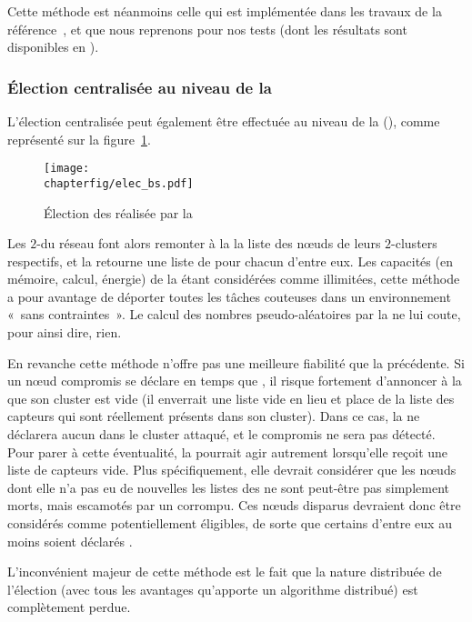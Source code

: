 Cette méthode est néanmoins celle qui est implémentée dans les travaux de la référence~\cite{GMT12}, et que nous reprenons pour nos tests (dont les résultats sont disponibles en ).

        \subsubsection{Élection centralisée au niveau de la \sdb}
L'élection centralisée peut également être effectuée au niveau de la \sdb (\BS), comme représenté sur la figure~\ref{sa:fig:elecbs}.
\begin{figure}[ht]
    \centering
    \texttt{[image: \\chapterfig/elec\_bs.pdf]}
    \caption{Élection des \cns réalisée par la \sdb}\label{sa:fig:elecbs}
\end{figure}
Les $2$-\CH du réseau font alors remonter à la \BS la liste des nœuds de leurs $2$-clusters respectifs, et la \BS retourne une liste de \cns pour chacun d'entre eux.
Les capacités (en mémoire, calcul, énergie) de la \sdb étant considérées comme illimitées, cette méthode a pour avantage de déporter toutes les tâches couteuses dans un environnement «~sans contraintes~».
Le calcul des nombres pseudo-aléatoires par la \sdb ne lui coute, pour ainsi dire, rien.

En revanche cette méthode n'offre pas une meilleure fiabilité que la précédente.
Si un nœud compromis se déclare en temps que \CH, il risque fortement d'annoncer à la \BS que son cluster est vide (il enverrait une liste vide en lieu et place de la liste des capteurs qui sont réellement présents dans son cluster).
Dans ce cas, la \sdb ne déclarera aucun \cn dans le cluster attaqué, et le \CH compromis ne sera pas détecté.
Pour parer à cette éventualité, la \sdb pourrait agir autrement lorsqu'elle reçoit une liste de capteurs vide.
Plus spécifiquement, elle devrait considérer que les nœuds dont elle n'a pas eu de nouvelles \via les listes des \CH ne sont peut-être pas simplement morts, mais escamotés par un \ch corrompu.
Ces nœuds disparus devraient donc être considérés comme potentiellement éligibles, de sorte que certains d'entre eux au moins soient déclarés \cns.

L'inconvénient majeur de cette méthode est le fait que la nature distribuée de l'élection (avec tous les avantages qu'apporte un algorithme distribué) est complètement
perdue.

